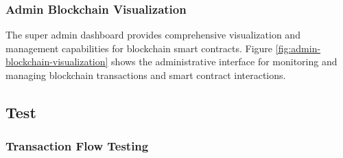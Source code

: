 

\subsubsection*{Admin Blockchain Visualization}

The super admin dashboard provides comprehensive visualization and management capabilities for blockchain smart contracts. Figure \ref{fig:admin-blockchain-visualization} shows the administrative interface for monitoring and managing blockchain transactions and smart contract interactions.


\subsection{Test}
\subsubsection{Transaction Flow Testing}

